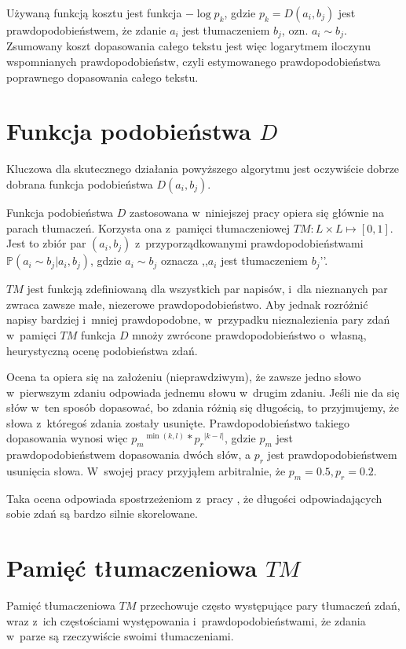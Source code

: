 \documentclass{pracamgr}
\begin{document}
Używaną funkcją kosztu jest funkcja $-\log p_k$, gdzie $p_k =
D(a_i, b_j)$ jest prawdopodobieństwem, że zdanie $a_i$
jest tłumaczeniem $b_j$, ozn. $a_i \sim b_j$. Zsumowany
koszt dopasowania całego tekstu jest więc logarytmem iloczynu
wspomnianych prawdopodobieństw, czyli estymowanego prawdopodobieństwa
poprawnego dopasowania całego tekstu.

\section{Funkcja podobieństwa $D$}

Kluczowa dla skutecznego działania powyższego algorytmu jest
oczywiście dobrze dobrana funkcja podobieństwa $D(a_i, b_j)$.

Funkcja podobieństwa $D$ zastosowana w~niniejszej pracy opiera się
głównie na parach tłumaczeń. Korzysta ona z~pamięci tłumaczeniowej
$TM : L \times L \mapsto [0, 1]$. Jest to zbiór par $(a_i, b_j)$
z~przyporządkowanymi prawdopodobieństwami
$\mathbb{P} (a_i \sim b_j | a_i, b_j)$, gdzie
$a_i \sim b_j$ oznacza ,,$a_i$ jest tłumaczeniem $b_j$’’.

$TM$ jest funkcją zdefiniowaną dla wszystkich par napisów, i~dla
nieznanych par zwraca zawsze małe, niezerowe prawdopodobieństwo. Aby
jednak rozróżnić napisy bardziej i~mniej prawdopodobne, w~przypadku
nieznalezienia pary zdań w~pamięci $TM$ funkcja $D$ mnoży zwrócone
prawdopodobieństwo o~własną, heurystyczną ocenę podobieństwa zdań.

Ocena ta opiera się na założeniu (nieprawdziwym), że zawsze jedno
słowo w~pierwszym zdaniu odpowiada jednemu słowu w~drugim
zdaniu. Jeśli nie da się słów w~ten sposób dopasować, bo zdania różnią
się długością, to przyjmujemy, że słowa z~któregoś zdania zostały
usunięte. Prawdopodobieństwo takiego dopasowania wynosi więc
$p_m{}^{\min(k, l)} * p_r{}^{|k-l|}$, gdzie $p_m$ jest prawdopodobieństwem
dopasowania dwóch słów, a $p_r$ jest prawdopodobieństwem usunięcia
słowa. W~swojej pracy przyjąłem arbitralnie, że $p_m = 0.5, p_r =
0.2$.

Taka ocena odpowiada spostrzeżeniom z~pracy \cite{church+gale}, że
długości odpowiadających sobie zdań są bardzo silnie skorelowane.

\section{Pamięć tłumaczeniowa $TM$}

Pamięć tłumaczeniowa $TM$ przechowuje często występujące pary
tłumaczeń zdań, wraz z~ich częstościami występowania i~prawdopodobieństwami,
że zdania w~parze są rzeczywiście swoimi tłumaczeniami.
\end{document}
